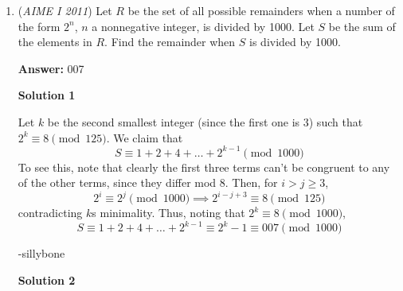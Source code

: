 \begin{enumerate}
 \textbf{Case} $n = 2c$\begin{align*}125(c-2)(c-1) &= 31(2c - 1)(2c - 2) \\&= 31 \cdot 2 \cdot (2c - 1)(c-1)\\125(c-2) &= 62(2c-1)\\c &= 188\\n &= 2c = 376\end{align*}


 \textbf{Case} $n = 2c - 1$\begin{align*}125(c-2)(c-1) &= 31(2c - 2)(2c - 3) \\&= 31 \cdot 2 \cdot (c - 1)(2c-3)\\125(c-2) &= 62(2c-3)\\c &= 64\\n &= 2c - 1 = 127\end{align*}


 The final is thus $376 + 127 = \boxed{503}$~clod

 \href{https://mathproblemsolvingskills.wordpress.com/}{MathProblemSolvingSkills.com}

 


	\item (\textit{AIME I 2011}) Let $R$ be the set of all possible remainders when a number of the form $2^n$, $n$ a nonnegative integer, is divided by 1000. Let $S$ be the sum of the elements in $R$. Find the remainder when $S$ is divided by 1000.


 
 \textbf{Answer: }007



\textbf{Solution 1}

Let $k$ be the second smallest integer (since the first one is $3$) such that $2^k \equiv 8 \pmod{125}$. We claim that 
 \[S\equiv 1+2+4+\dots+2^{k-1} \pmod{1000}\] To see this, note that clearly the first three terms can't be congruent to any of the other terms, since they differ mod 8. Then, for $i> j\geq 3$,
 \[2^i\equiv 2^j \pmod{1000} \implies 2^{i-j+3} \equiv 8 \pmod{125}\] contradicting $k$s minimality. Thus, noting that $2^k\equiv 8\pmod{1000}$, 
 \[S\equiv 1+2+4+\dots +2^{k-1} \equiv 2^k-1 \equiv \boxed{007} \pmod{1000}\]

 -sillybone

 



\textbf{Solution 2}


\end{enumerate}
